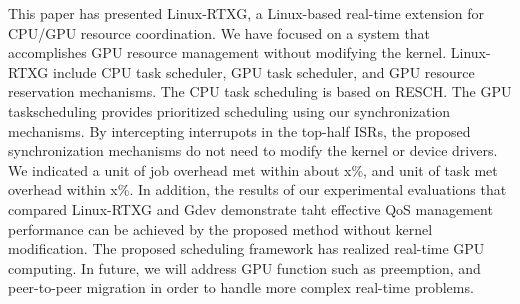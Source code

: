\label{sec:conclusion}
This paper has presented Linux-RTXG, a Linux-based real-time extension for CPU/GPU resource coordination.
We have focused on a system that accomplishes GPU resource management without modifying the kernel.
Linux-RTXG include CPU task scheduler, GPU task scheduler, and GPU resource reservation mechanisms.
The CPU task scheduling is based on RESCH.
The GPU taskscheduling provides prioritized scheduling using our synchronization mechanisms.
By intercepting interrupots in the top-half ISRs, the proposed synchronization mechanisms do not need to modify the kernel or device drivers.
We indicated a unit of job overhead met within about x\%, and unit of task met overhead within x\%.
In addition, the results of our experimental evaluations that compared Linux-RTXG and Gdev demonstrate taht effective QoS management performance can be achieved by the proposed method without kernel modification.
The proposed scheduling framework has realized real-time GPU computing.
In future, we will address GPU function such as preemption, and peer-to-peer migration in order to handle more complex real-time problems.
